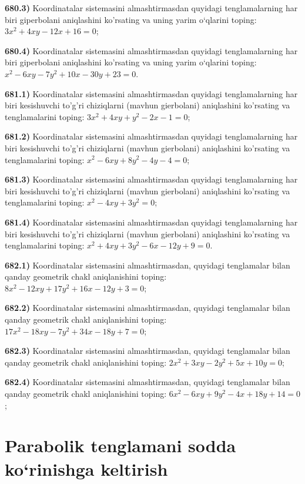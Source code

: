 \textbf{680.3)} Koordinatalar sistemasini almashtirmasdan quyidagi tenglamalarning har biri giperbolani aniqlashini ko'rsating va uning yarim o‘qlarini toping: $3 x^2+4 x y-12 x+16=0$;

\textbf{680.4)} Koordinatalar sistemasini almashtirmasdan quyidagi tenglamalarning har biri giperbolani aniqlashini ko'rsating va uning yarim o‘qlarini toping: $x^2-6 x y-7 y^2+10 x-30 y+23=0$.

\textbf{681.1)} Koordinatalar sistemasini almashtirmasdan quyidagi tenglamalarning har biri kesishuvchi to'g'ri chiziqlarni (mavhun gierbolani) aniqlashini ko'rsating va tenglamalarini toping: $3 x^2+4 x y+y^2-2 x-1=0$;

\textbf{681.2)} Koordinatalar sistemasini almashtirmasdan quyidagi tenglamalarning har biri kesishuvchi to'g'ri chiziqlarni (mavhun gierbolani) aniqlashini ko'rsating va tenglamalarini toping: $x^2-6 x y+8 y^2-4 y-4=0$;

\textbf{681.3)} Koordinatalar sistemasini almashtirmasdan quyidagi tenglamalarning har biri kesishuvchi to'g'ri chiziqlarni (mavhun gierbolani) aniqlashini ko'rsating va tenglamalarini toping: $x^2-4 x y+3 y^2=0$;

\textbf{681.4)} Koordinatalar sistemasini almashtirmasdan quyidagi tenglamalarning har biri kesishuvchi to'g'ri chiziqlarni (mavhun gierbolani) aniqlashini ko'rsating va tenglamalarini toping: $x^2+4 x y+3 y^2-6 x-12 y+9=0$.

\textbf{682.1)} Koordinatalar sistemasini almashtirmasdan, quyidagi tenglamalar bilan qanday geometrik chakl aniqlanishini toping: $8 x^2-12 x y+17 y^2+16 x-12 y+3=0$;

\textbf{682.2)} Koordinatalar sistemasini almashtirmasdan, quyidagi tenglamalar bilan qanday geometrik chakl aniqlanishini toping: $17 x^2-18 x y-7 y^2+34 x-18 y+7=0$;

\textbf{682.3)} Koordinatalar sistemasini almashtirmasdan, quyidagi tenglamalar bilan qanday geometrik chakl aniqlanishini toping: $2 x^2+3 x y-2 y^2+5 x+10 y=0$;

\textbf{682.4)} Koordinatalar sistemasini almashtirmasdan, quyidagi tenglamalar bilan qanday geometrik chakl aniqlanishini toping: $6 x^2-6 x y+9 y^2-4 x+18 y+14=0$;



\section{Parabolik tenglamani sodda ko‘rinishga keltirish}



